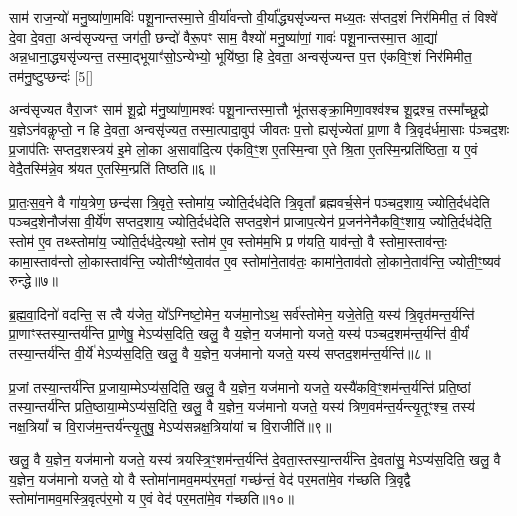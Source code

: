 साम॑ राज॒न्यो॑ मनु॒ष्या॑णा॒मविः॑ पशू॒नान्तस्मा॒त्ते वी॒र्या॑वन्तो वी॒र्या᳚द्ध्यसृ॑ज्यन्त मध्य॒तः स॑प्तद॒शं निर॑मिमीत॒ तं विश्वे॑ दे॒वा दे॒वता॒ अन्व॑सृज्यन्त॒ जग॑ती॒ छन्दो॑ वैरू॒पꣳ साम॒ वैश्यो॑ मनु॒ष्या॑णां॒ गावः॑ पशू॒नान्तस्मा॒त्त आ॒द्या॑ अन्न॒धाना॒\-द्ध्यसृ॑ज्यन्त॒ तस्मा॒द्भूयाꣳ॑सो॒\-ऽन्येभ्यो॒ भूयि॑ष्ठा॒ हि दे॒वता॒ अन्वसृ॑ज्यन्त प॒त्त ए॑कवि॒ꣳ॒शं निर॑मिमीत॒ तम॑नु॒ष्टुप्छन्दः॑ [5[]

अन्व॑सृज्यत वैरा॒जꣳ साम॑ शू॒द्रो म॑नु॒ष्या॑णा॒मश्वः॑ पशू॒नान्तस्मा॒त्तौ भू॑तसङ्क्रा॒मिणा॒वश्व॑श्च शू॒द्रश्च॒ तस्मा᳚च्छू॒द्रो य॒ज्ञे\-ऽन॑वकॢप्तो॒ न हि दे॒वता॒ अन्वसृ॑ज्यत॒ तस्मा॒त्पादा॒वुप॑ जीवतः प॒त्तो ह्यसृ॑ज्येतां प्रा॒णा वै त्रि॒वृद॑र्धमा॒साः प॑ञ्चद॒शः प्र॒जाप॑तिः सप्तद॒शस्त्रय॑ इ॒मे लो॒का अ॒सावा॑दि॒त्य ए॑कवि॒ꣳ॒श ए॒तस्मि॒न्वा ए॒ते श्रि॒ता ए॒तस्मि॒न्प्रति॑ष्ठिता॒ य ए॒वं वेदै॒तस्मि॑न्ने॒व श्र॑यत ए॒तस्मि॒न्प्रति॑ तिष्ठति॥६॥

{\anuvakamend[{अस्थू॑रि॒रोष॑धीषु ज्येष्ठय॒ज्ञ इति॑ बृ॒हद॑नु॒ष्टुप्छन्दः॒ प्रति॑ष्ठिता॒ नव॑ च॥१॥}]}

प्रा॒तः॒स॒व॒ने वै गा॑य॒त्रेण॒ छन्द॑सा त्रि॒वृते॒ स्तोमा॑य॒ ज्योति॒र्दध॑देति त्रि॒वृता᳚ ब्रह्मवर्च॒सेन॑ पञ्चद॒शाय॒ ज्योति॒र्दध॑देति पञ्चद॒शेनौज॑सा वी॒र्ये॑ण सप्तद॒शाय॒ ज्योति॒र्दध॑देति सप्तद॒शेन॑ प्राजाप॒त्येन॑ प्र॒जन॑नेनैकवि॒ꣳ॒शाय॒ ज्योति॒र्दध॑देति॒ स्तोम॑ ए॒व तथ्स्तोमा॑य॒ ज्योति॒र्दध॑दे॒त्यथो॒ स्तोम॑ ए॒व स्तोम॑म॒भि प्र ण॑यति॒ याव॑न्तो॒ वै स्तोमा॒स्ताव॑न्तः॒ कामा॒स्ताव॑न्तो लो॒कास्ताव॑न्ति॒ ज्योतीꣳ॑ष्ये॒ताव॑त ए॒व स्तोमा॑ने॒ताव॑तः॒ कामा॑ने॒ताव॑तो लो॒काने॒ताव॑न्ति॒ ज्योती॒ꣳ॒ष्यव॑ रुन्द्धे॥७॥

{\anuvakamend[{ताव॑न्तो लो॒कास्त्रयो॑दश च॥२॥}]}

ब्र॒ह्म॒वा॒दिनो॑ वदन्ति॒ स त्वै य॑जेत॒ यो᳚\-ऽग्निष्टो॒मेन॒ यज॑मा॒नो\-ऽथ॒ सर्व॑स्तोमेन॒ यजे॒तेति॒ यस्य॑ त्रि॒वृत॑मन्त॒र्यन्ति॑ प्रा॒णाꣳस्तस्या॒न्तर्य॑न्ति प्रा॒णेषु॒ मे\-ऽप्य॑स॒दिति॒ खलु॒ वै य॒ज्ञेन॒ यज॑मानो यजते॒ यस्य॑ पञ्चद॒शम॑न्त॒र्यन्ति॑ वी॒र्यं॑ तस्या॒न्तर्य॑न्ति वी॒र्ये॑ मे\-ऽप्य॑स॒दिति॒ खलु॒ वै य॒ज्ञेन॒ यज॑मानो यजते॒ यस्य॑ सप्तद॒शम॑न्त॒र्यन्ति॑॥८॥

प्र॒जां तस्या॒न्तर्य॑न्ति प्र॒जाया॒म्मे\-ऽप्य॑स॒दिति॒ खलु॒ वै य॒ज्ञेन॒ यज॑मानो यजते॒ यस्यै॑कवि॒ꣳ॒शम॑न्त॒र्यन्ति॑ प्रति॒ष्ठां तस्या॒न्तर्य॑न्ति प्रति॒ष्ठाया॒म्मे\-ऽप्य॑स॒दिति॒ खलु॒ वै य॒ज्ञेन॒ यज॑मानो यजते॒ यस्य॑ त्रिण॒वम॑न्त॒र्यन्त्यृ॒तूꣳश्च॒ तस्य॑ नक्ष॒त्रियां᳚ च वि॒राज॑म॒न्तर्य॑न्त्यृ॒तुषु॒ मे\-ऽप्य॑सन्नक्ष॒त्रिया॑यां च वि॒राजीति॑॥९॥

खलु॒ वै य॒ज्ञेन॒ यज॑मानो यजते॒ यस्य॑ त्रयस्त्रि॒ꣳ॒शम॑न्त॒र्यन्ति॑ दे॒वता॒स्तस्या॒न्तर्य॑न्ति दे॒वता॑सु॒ मे\-ऽप्य॑स॒दिति॒ खलु॒ वै य॒ज्ञेन॒ यज॑मानो यजते॒ यो वै स्तोमा॑नामव॒मम्प॑र॒मतां॒ गच्छ॑न्तं॒ वेद॑ पर॒मता॑मे॒व ग॑च्छति त्रि॒वृद्वै स्तोमा॑नामव॒म\-स्त्रि॒वृत्प॑र॒मो य ए॒वं वेद॑ पर॒मता॑मे॒व ग॑च्छति॥१०॥

